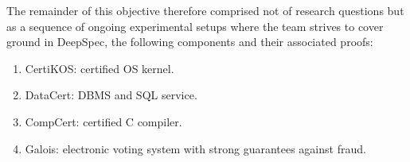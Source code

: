 The remainder of this objective therefore comprised not of research questions but as a sequence of ongoing experimental setups where the team strives to cover ground in DeepSpec, \esp the following components and their associated proofs:
\begin{enumerate}
  \item CertiKOS: certified OS kernel.
  \item DataCert: DBMS and SQL service.
  \item CompCert: certified C compiler.
  \item Galois: electronic voting system with strong guarantees against fraud.
\end{enumerate}

